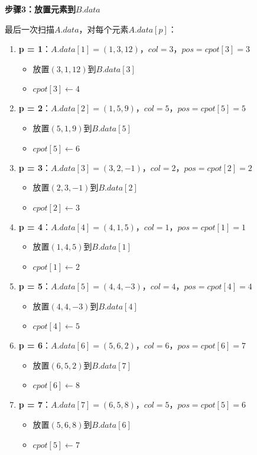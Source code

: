 \documentclass[12pt,a4paper]{amsart}
\begin{document}
\textbf{步骤3：放置元素到$B.data$}

最后一次扫描$A.data$，对每个元素$A.data[p]$：

\begin{enumerate}
\item \textbf{p = 1}：$A.data[1] = (1, 3, 12)$，$col=3$，$pos = cpot[3] = 3$
    \begin{itemize}
    \item 放置$(3, 1, 12)$到$B.data[3]$
    \item $cpot[3] \leftarrow 4$
    \end{itemize}

\item \textbf{p = 2}：$A.data[2] = (1, 5, 9)$，$col=5$，$pos = cpot[5] = 5$
    \begin{itemize}
    \item 放置$(5, 1, 9)$到$B.data[5]$
    \item $cpot[5] \leftarrow 6$
    \end{itemize}

\item \textbf{p = 3}：$A.data[3] = (3, 2, -1)$，$col=2$，$pos = cpot[2] = 2$
    \begin{itemize}
    \item 放置$(2, 3, -1)$到$B.data[2]$
    \item $cpot[2] \leftarrow 3$
    \end{itemize}

\item \textbf{p = 4}：$A.data[4] = (4, 1, 5)$，$col=1$，$pos = cpot[1] = 1$
    \begin{itemize}
    \item 放置$(1, 4, 5)$到$B.data[1]$
    \item $cpot[1] \leftarrow 2$
    \end{itemize}

\item \textbf{p = 5}：$A.data[5] = (4, 4, -3)$，$col=4$，$pos = cpot[4] = 4$
    \begin{itemize}
    \item 放置$(4, 4, -3)$到$B.data[4]$
    \item $cpot[4] \leftarrow 5$
    \end{itemize}

\item \textbf{p = 6}：$A.data[6] = (5, 6, 2)$，$col=6$，$pos = cpot[6] = 7$
    \begin{itemize}
    \item 放置$(6, 5, 2)$到$B.data[7]$
    \item $cpot[6] \leftarrow 8$
    \end{itemize}

\item \textbf{p = 7}：$A.data[7] = (6, 5, 8)$，$col=5$，$pos = cpot[5] = 6$
    \begin{itemize}
    \item 放置$(5, 6, 8)$到$B.data[6]$
    \item $cpot[5] \leftarrow 7$
    \end{itemize}
\end{enumerate}
\end{document}
